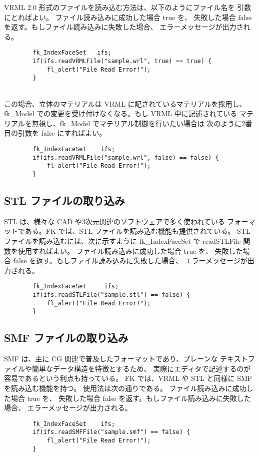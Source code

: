 VRML 2.0 形式のファイルを読み込む方法は、以下のようにファイル名を
引数にとればよい。
ファイル読み込みに成功した場合 true を、
失敗した場合 false を返す。もしファイル読み込みに失敗した場合、
エラーメッセージが出力される。
\\
\begin{screen}
\begin{verbatim}
        fk_IndexFaceSet   ifs;
        if(ifs.readVRMLFile("sample.wrl", true) == true) {
            fl_alert("File Read Error!");
        }
\end{verbatim}
\end{screen}
~ \\
この場合、立体のマテリアルは VRML に記されているマテリアルを採用し、
fk\_Model での変更を受け付けなくなる。もし VRML 中に記述されている
マテリアルを無視し、fk\_Model でマテリアル制御を行いたい場合は
次のように2番目の引数を false にすればよい。
\\
\begin{screen}
\begin{verbatim}
        fk_IndexFaceSet    ifs;
        if(ifs.readVRMLFile("sample.wrl", false) == false) {
            fl_alert("File Read Error!");
        }
\end{verbatim}
\end{screen}
\subsection{STL ファイルの取り込み}
STL は、様々な CAD や3次元関連のソフトウェアで多く使われている
フォーマットである。FK では、STL ファイルを読み込む機能も提供されている。
STL ファイルを読み込むには、次に示すように fk\_IndexFaceSet で
readSTLFile 関数を使用すればよい。
ファイル読み込みに成功した場合 true を、
失敗した場合 false を返す。もしファイル読み込みに失敗した場合、
エラーメッセージが出力される。
\\
\begin{screen}
\begin{verbatim}
        fk_IndexFaceSet     ifs;
        if(ifs.readSTLFile("sample.stl") == false) {
            fl_alert("File Read Error!");
        }
\end{verbatim}
\end{screen}
\subsection{SMF ファイルの取り込み}
SMF は、主に CG 関連で普及したフォーマットであり、プレーンな
テキストファイルや簡単なデータ構造を特徴とするため、
実際にエディタで記述するのが容易であるという利点も持っている。
FK では、VRML や STL と同様に SMF を読み込む機能を持つ。
使用法は次の通りである。
ファイル読み込みに成功した場合 true を、
失敗した場合 false を返す。もしファイル読み込みに失敗した場合、
エラーメッセージが出力される。
\\
\begin{screen}
\begin{verbatim}
        fk_IndexFaceSet    ifs;
        if(ifs.readSMFFile("sample.smf") == false) {
            fl_alert("File Read Error!");
        }
\end{verbatim}
\end{screen}
